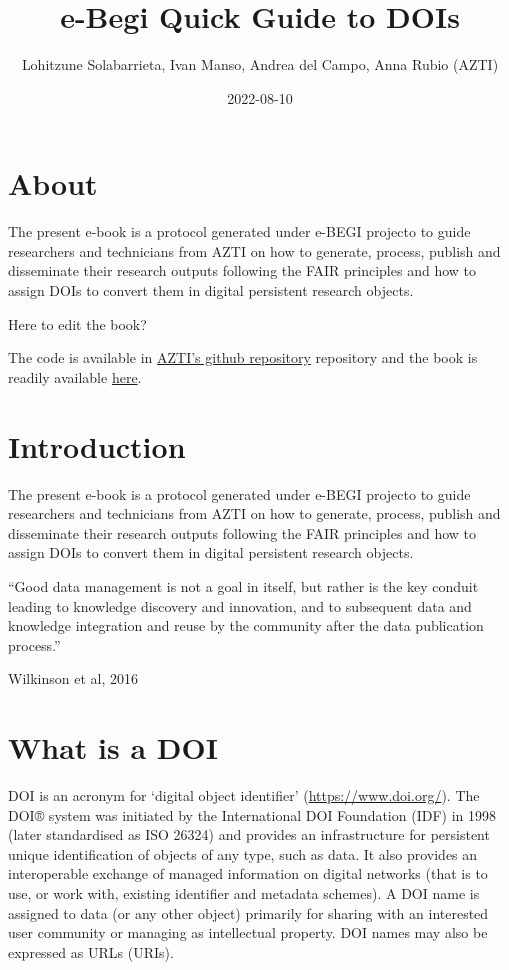 \documentclass[
]{book}
\title{e-Begi Quick Guide to DOIs}
\author{Lohitzune Solabarrieta, Ivan Manso, Andrea del Campo, Anna Rubio (AZTI)}
\date{2022-08-10}
\begin{document}
\maketitle

{
\setcounter{tocdepth}{1}
\tableofcontents
}
\hypertarget{about}{%
\chapter*{About}\label{about}}

The present e-book is a protocol generated under e-BEGI projecto to guide researchers and technicians from AZTI on how to generate, process, publish and disseminate their research outputs following the FAIR principles and how to assign DOIs to convert them in digital persistent research objects.

Here to edit the book?

The code is available in \href{https://github.com/Fundacion-AZTI/ebegi_quickguide2DOIs}{AZTI's github repository} repository and the book is readily available \href{https://fundacion-azti.github.io/ebegi_quickguide2DOIs/}{here}.

\hypertarget{introduction}{%
\chapter{Introduction}\label{introduction}}

The present e-book is a protocol generated under e-BEGI projecto to guide researchers and technicians from AZTI on how to generate, process, publish and disseminate their research outputs following the FAIR principles and how to assign DOIs to convert them in digital persistent research objects.

``Good data management is not a goal in itself, but rather is the key conduit leading to knowledge discovery and innovation, and to subsequent data and knowledge integration and reuse by the community after the data publication process.''

Wilkinson et al, 2016

\hypertarget{what-is-a-doi}{%
\chapter{What is a DOI}\label{what-is-a-doi}}

DOI is an acronym for `digital object identifier' (\url{https://www.doi.org/}). The DOI® system was initiated by the International DOI Foundation (IDF) in 1998 (later standardised as ISO 26324) and provides an infrastructure for persistent unique identification of objects of any type, such as data. It also provides an interoperable exchange of managed information on digital networks (that is to use, or work with, existing identifier and metadata schemes). A DOI name is assigned to data (or any other object) primarily for sharing with an interested user community or managing as intellectual property. DOI names may also be expressed as URLs (URIs).
\end{document}
